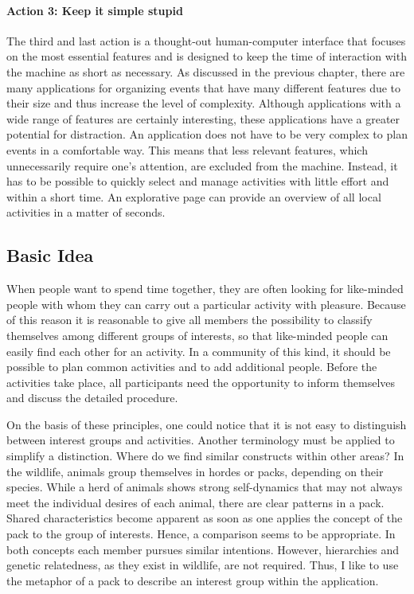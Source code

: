 \documentclass[12pt,numbers=noenddot,parskip,bibliography=totocnumbered,listof=totocnumbered,draft]{scrreprt}
\begin{document}
\paragraph{Action 3: Keep it simple stupid}
The third and last action is a thought-out human-computer interface that focuses on the most essential features and is designed to keep the time of interaction with the machine as short as necessary. As discussed in the previous chapter, there are many applications for organizing events that have many different features due to their size and thus increase the level of complexity. Although applications with a wide range of features are certainly interesting, these applications have a greater potential for distraction. An application does not have to be very complex to plan events in a comfortable way. \newline
This means that less relevant features, which unnecessarily require one's attention, are excluded from the machine. Instead, it has to be possible to quickly select and manage activities with little effort and within a short time. An explorative page can provide an overview of all local activities in a matter of seconds.

\subsection{Basic Idea}
When people want to spend time together, they are often looking for like-minded people with whom they can carry out a particular activity with pleasure. Because of this reason it is reasonable to give all members the possibility to classify themselves among different groups of interests, so that like-minded people can easily find each other for an activity. In a community of this kind, it should be possible to plan common activities and to add additional people. Before the activities take place, all participants need the opportunity to inform themselves and discuss the detailed procedure. 

On the basis of these principles, one could notice that it is not easy to distinguish between interest groups and activities. Another terminology must be applied to simplify a distinction. Where do we find similar constructs within other areas? In the wildlife, animals group themselves in hordes or packs, depending on their species. While a herd of animals shows strong self-dynamics that may not always meet the individual desires of each animal, there are clear patterns in a pack. Shared characteristics become apparent as soon as one applies the concept of the pack to the group of interests. Hence, a comparison seems to be appropriate. In both concepts each member pursues similar intentions. However, hierarchies and genetic relatedness, as they exist in wildlife, are not required. Thus, I like to use the metaphor of a pack to describe an interest group within the application.
\end{document}
